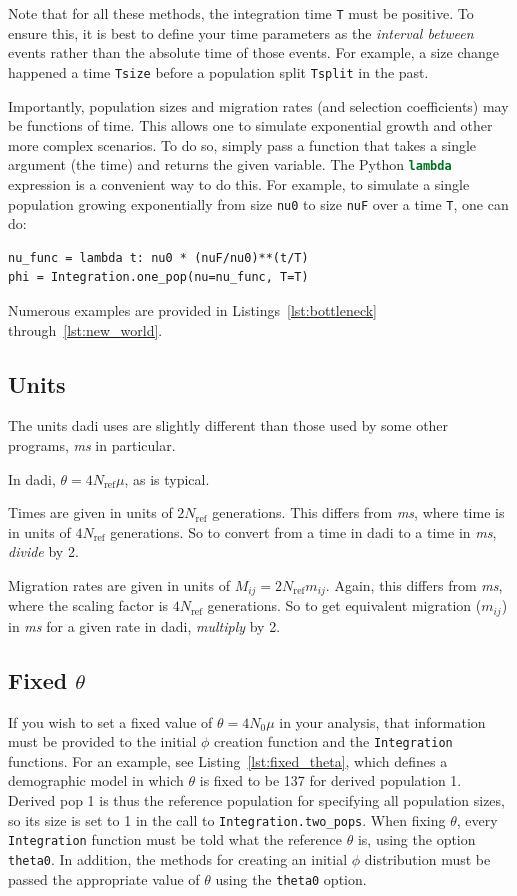\documentclass[12pt]{article}
\makeatletter
\newcommand{\dadi}{dadi\xspace}
\newcommand{\Nref}{\ensuremath{N_\text{ref}}\xspace}
\newcommand{\ms}{\emph{ms}\xspace}
\newcommand{\py}[1]{\lstinline[language=Python, showstringspaces=False]@#1@}
\makeatother
\begin{document}
Note that for all these methods, the integration time \py{T} must be positive.
To ensure this, it is best to define your time parameters as the \emph{interval between} events rather than the absolute time of those events.
For example, a size change happened a time \py{Tsize} before a population split \py{Tsplit} in the past.

Importantly, population sizes and migration rates (and selection coefficients) may be functions of time.
This allows one to simulate exponential growth and other more complex scenarios.
To do so, simply pass a function that takes a single argument (the time) and returns the given variable.
The Python \py{lambda} expression is a convenient way to do this.
For example, to simulate a single population growing exponentially from size \py{nu0} to size \py{nuF} over a time \py{T}, one can do:
\begin{lstlisting}
nu_func = lambda t: nu0 * (nuF/nu0)**(t/T)
phi = Integration.one_pop(nu=nu_func, T=T)
\end{lstlisting}

Numerous examples are provided in Listings~\ref{lst:bottleneck} through~\ref{lst:new_world}.

\subsection{Units}
The units \dadi uses are slightly different than those used by some other programs, \ms in particular.

In \dadi, $\theta = 4 \Nref \mu$, as is typical.

Times are given in units of $2 \Nref$ generations.
This differs from \emph{ms}, where time is in units of $4 \Nref$ generations.
So to convert from a time in \dadi to a time in \emph{ms}, \emph{divide} by 2.

Migration rates are given in units of $M_{ij} = 2 \Nref m_{ij}$.
Again, this differs from \emph{ms}, where the scaling factor is $4 \Nref$ generations.
So to get equivalent migration ($m_{ij}$) in \ms for a given rate in \dadi, \emph{multiply} by 2.


\subsection{Fixed $\theta$}\label{sec:fixed_theta}

If you wish to set a fixed value of $\theta = 4 N_0 \mu$ in your analysis, that information must be provided to the initial $\phi$ creation function and the \py{Integration} functions.
For an example, see Listing~\ref{lst:fixed_theta}, which defines a demographic model in which $\theta$ is fixed to be 137 for derived population 1.
Derived pop 1 is thus the reference population for specifying all population sizes, so its size is set to 1 in the call to \py{Integration.two_pops}.
When fixing $\theta$, every \py{Integration} function must be told what the reference $\theta$ is, using the option \py{theta0}.
In addition, the methods for creating an initial $\phi$ distribution must be passed the appropriate value of $\theta$ using the \py{theta0} option.
\end{document}
